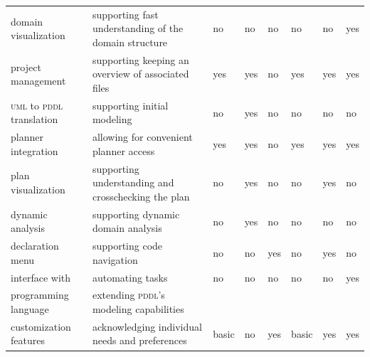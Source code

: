 \documentclass[runningheads]{llncs}
\newcommand{\pddl}{\textsc{pddl}\xspace}
\newcommand{\uml}{\textsc{uml}\xspace}
\begin{document}
\begin{table}
\begin{tabularx}{\textwidth}{lX|llllll}
  domain visualization                & supporting fast understanding of the domain structure & no                          & no                        & no                            &   no     & no      & yes       \\
  project management                  & supporting keeping an overview of associated files    & yes                         & yes                       & no                            &   yes    & yes     & yes       \\
  \uml to \pddl translation           & supporting initial modeling                           & no                          & yes                       & no                            &   no     & no      & no       \\
  planner integration                 & allowing for convenient planner access                & yes                       & yes                       & no                            &   yes    & yes     & yes       \\
  plan visualization                  & supporting understanding and crosschecking the plan   & no                          & yes                       & no                            &   no     & yes     & no        \\
  dynamic analysis                    & supporting dynamic domain analysis                    & no                          & yes                       & no                            &   no     & no      & no        \\
  declaration menu                    & supporting code navigation                            & no                          & no                        & yes                           &   no     & yes     & no        \\
  interface with                      & automating tasks                                      & no                          & no                        & no                            &   no     & no      & yes       \\
  programming language                & extending \pddl's modeling capabilities               &                             &                           &                               &          &         &           \\
  customization features              & acknowledging individual needs and preferences        & basic                       & no                        & yes                           &  basic   & yes     & yes       \\
\end{tabularx}
\label{tab:comparison}
\end{table}
\end{document}
